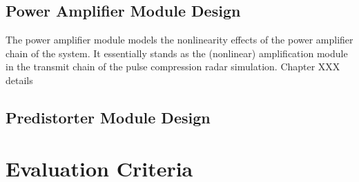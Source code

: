 \subsection{Power Amplifier Module Design}

The power amplifier module models the nonlinearity effects of the power amplifier chain of the system. It essentially stands as the (nonlinear) amplification module in the transmit chain of the pulse compression radar simulation. Chapter XXX details 

\subsection{Predistorter Module Design}

\section{Evaluation Criteria}


